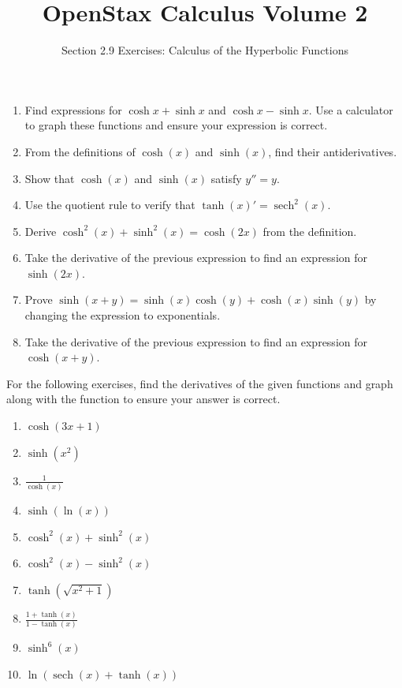 \documentclass{exercises}
\title{OpenStax Calculus Volume 2}
\subtitle{Section 2.9 Exercises: Calculus of the Hyperbolic Functions}
\author{}
\date{}
\begin{document}
\maketitle

\begin{enumerate}[start=1]
\item \techrequired Find expressions for $\cosh x+\sinh x$ and $\cosh x-\sinh x$. Use a calculator to graph these functions and ensure your expression is correct.
\item From the definitions of $\cosh(x)$ and $\sinh(x)$, find their antiderivatives.
\item Show that $\cosh(x)$ and $\sinh(x)$ satisfy $y''=y$.
\item Use the quotient rule to verify that $\tanh(x)'=\operatorname{sech}^{2}(x)$.
\item Derive $\cosh^{2}(x)+\sinh^{2}(x)=\cosh(2x)$ from the definition.
\item Take the derivative of the previous expression to find an expression for $\sinh(2x)$.
\item Prove $\sinh(x+y)=\sinh(x)\cosh(y)+\cosh(x)\sinh(y)$ by changing the expression to exponentials.
\item Take the derivative of the previous expression to find an expression for $\cosh(x+y)$.
\end{enumerate}

For the following exercises, find the derivatives of the given functions and graph along with the function to ensure your answer is correct.

\begin{enumerate}[resume]
\item \techrequired $\cosh(3x+1)$
\item \techrequired $\sinh(x^{2})$
\item \techrequired $\frac{1}{\cosh(x)}$
\item \techrequired $\sinh(\ln(x))$
\item \techrequired $\cosh^{2}(x)+\sinh^{2}(x)$
\item \techrequired $\cosh^{2}(x)-\sinh^{2}(x)$
\item \techrequired $\tanh(\sqrt{x^{2}+1})$
\item \techrequired $\frac{1+\tanh(x)}{1-\tanh(x)}$
\item \techrequired $\sinh^{6}(x)$
\item \techrequired $\ln(\operatorname{sech}(x)+\tanh(x))$
\end{enumerate}
\end{document}
